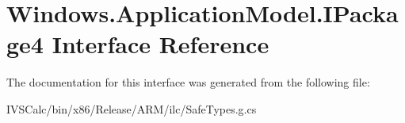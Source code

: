 \hypertarget{interface_windows_1_1_application_model_1_1_i_package4}{}\section{Windows.\+Application\+Model.\+I\+Package4 Interface Reference}
\label{interface_windows_1_1_application_model_1_1_i_package4}


The documentation for this interface was generated from the following file\+:\begin{DoxyCompactItemize}
\item 
I\+V\+S\+Calc/bin/x86/\+Release/\+A\+R\+M/ilc/Safe\+Types.\+g.\+cs\end{DoxyCompactItemize}
